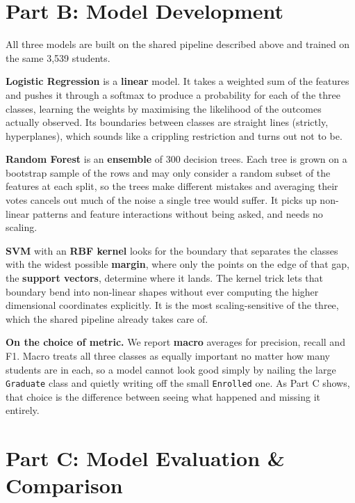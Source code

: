\documentclass[11pt,a4paper]{article}
\begin{document}
\section*{Part B: Model Development}

All three models are built on the shared pipeline described above and trained on the
same 3,539 students.

\textbf{Logistic Regression} is a \textbf{linear} model. It takes a weighted sum of the
features and pushes it through a softmax to produce a probability for each of the three
classes, learning the weights by maximising the likelihood of the outcomes actually
observed. Its boundaries between classes are straight lines (strictly, hyperplanes),
which sounds like a crippling restriction and turns out not to be.

\textbf{Random Forest} is an \textbf{ensemble} of 300 decision trees. Each tree is grown
on a bootstrap sample of the rows and may only consider a random subset of the features
at each split, so the trees make different mistakes and averaging their votes cancels
out much of the noise a single tree would suffer. It picks up non-linear patterns and
feature interactions without being asked, and needs no scaling.

\textbf{SVM} with an \textbf{RBF kernel} looks for the boundary that separates the
classes with the widest possible \textbf{margin}, where only the points on the edge of
that gap, the \textbf{support vectors}, determine where it lands. The kernel trick lets
that boundary bend into non-linear shapes without ever computing the higher dimensional
coordinates explicitly. It is the most scaling-sensitive of the three, which the shared
pipeline already takes care of.

\textbf{On the choice of metric.} We report \textbf{macro} averages for precision,
recall and F1. Macro treats all three classes as equally important no matter how many
students are in each, so a model cannot look good simply by nailing the large
\texttt{Graduate} class and quietly writing off the small \texttt{Enrolled} one. As Part
C shows, that choice is the difference between seeing what happened and missing it
entirely.

\section*{Part C: Model Evaluation \& Comparison}
\end{document}
